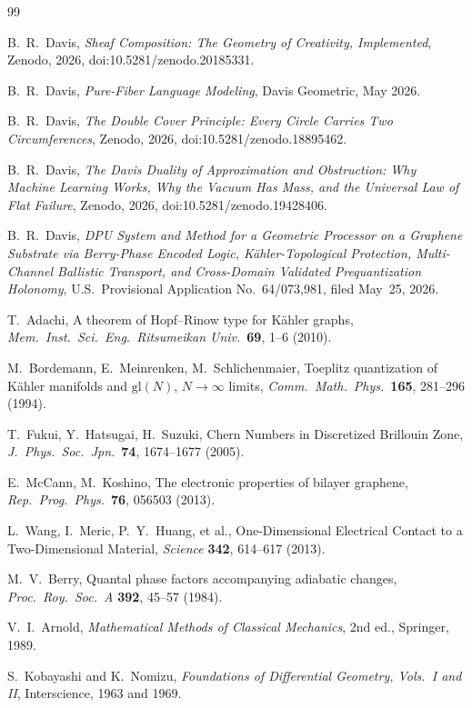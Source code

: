 \documentclass[11pt,letterpaper]{article}
\begin{document}
\begin{thebibliography}{99}

B.~R.\ Davis,
\emph{Sheaf Composition: The Geometry of Creativity, Implemented},
Zenodo, 2026, doi:10.5281/zenodo.20185331.

B.~R.\ Davis,
\emph{Pure-Fiber Language Modeling},
Davis Geometric, May 2026.

B.~R.\ Davis,
\emph{The Double Cover Principle: Every Circle Carries Two
Circumferences},
Zenodo, 2026, doi:10.5281/zenodo.18895462.

B.~R.\ Davis,
\emph{The Davis Duality of Approximation and Obstruction: Why
Machine Learning Works, Why the Vacuum Has Mass, and the Universal
Law of Flat Failure},
Zenodo, 2026, doi:10.5281/zenodo.19428406.

B.~R.\ Davis,
\emph{DPU System and Method for a Geometric Processor on a Graphene
Substrate via Berry-Phase Encoded Logic, K\"ahler-Topological
Protection, Multi-Channel Ballistic Transport, and Cross-Domain
Validated Prequantization Holonomy},
U.S.\ Provisional Application No.~64/073,981, filed May~25, 2026.

T.~Adachi,
A theorem of Hopf--Rinow type for K\"ahler graphs,
\emph{Mem.\ Inst.\ Sci.\ Eng.\ Ritsumeikan Univ.}\ \textbf{69},
1--6 (2010).

M.~Bordemann, E.~Meinrenken, M.~Schlichenmaier,
Toeplitz quantization of K\"ahler manifolds and $\mathrm{gl}(N)$,
$N \to \infty$ limits,
\emph{Comm.\ Math.\ Phys.}\ \textbf{165}, 281--296 (1994).

T.~Fukui, Y.~Hatsugai, H.~Suzuki,
Chern Numbers in Discretized Brillouin Zone,
\emph{J.\ Phys.\ Soc.\ Jpn.}\ \textbf{74}, 1674--1677 (2005).

E.~McCann, M.~Koshino,
The electronic properties of bilayer graphene,
\emph{Rep.\ Prog.\ Phys.}\ \textbf{76}, 056503 (2013).

L.~Wang, I.~Meric, P.~Y.~Huang, et al.,
One-Dimensional Electrical Contact to a Two-Dimensional Material,
\emph{Science} \textbf{342}, 614--617 (2013).

M.~V.\ Berry,
Quantal phase factors accompanying adiabatic changes,
\emph{Proc.\ Roy.\ Soc.\ A} \textbf{392}, 45--57 (1984).

V.~I.\ Arnold,
\emph{Mathematical Methods of Classical Mechanics}, 2nd ed.,
Springer, 1989.

S.~Kobayashi and K.~Nomizu,
\emph{Foundations of Differential Geometry, Vols.~I and II},
Interscience, 1963 and 1969.

\end{thebibliography}
\end{document}
